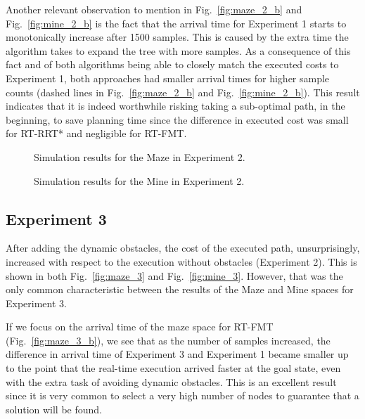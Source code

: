 Another relevant observation to mention in Fig.~\ref{fig:maze_2_b} and Fig.~\ref{fig:mine_2_b} is the fact that the arrival time for Experiment 1 starts to monotonically increase after 1500 samples. This is caused by the extra time the algorithm takes to expand the tree with more samples. As a consequence of this fact and of both algorithms being able to closely match the executed costs to Experiment 1, both approaches had smaller arrival times for higher sample counts (dashed lines in  Fig.~\ref{fig:maze_2_b} and Fig.~\ref{fig:mine_2_b}). This result indicates that it is indeed worthwhile risking taking a sub-optimal path, in the beginning, to save planning time since the difference in executed cost was small for RT-RRT* and negligible for RT-FMT.
\begin{figure}
\centering
{}
\caption{Simulation results for the Maze in Experiment 2.}
\label{fig:maze_2}
\centering
{}
\caption{Simulation results for the Mine in Experiment 2.}
\label{fig:mine_2}
\end{figure}

\subsection{Experiment 3}

After adding the dynamic obstacles, the cost of the executed path, unsurprisingly, increased with respect to the execution without obstacles (Experiment 2). This is shown in both  Fig.~\ref{fig:maze_3} and Fig.~\ref{fig:mine_3}. However, that was the only common characteristic between the results of the Maze and Mine spaces for Experiment 3. 

If we focus on the arrival time of the maze space for RT-FMT (Fig.~\ref{fig:maze_3_b}), we see that as the number of samples increased, the difference in arrival time of Experiment 3 and Experiment 1 became smaller up to the point that the real-time execution arrived faster at the goal state, even with the extra task of avoiding dynamic obstacles. This is an excellent result since it is very common to select a very high number of nodes to guarantee that a solution will be found.

